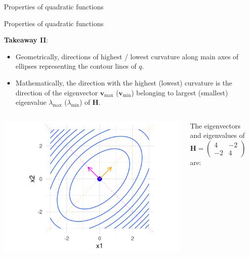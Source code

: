 \begin{frame}{Properties of quadratic functions}
{  }
  
  \end{frame}
  
  
  \begin{frame}{Properties of quadratic functions}
  
  \textbf{Takeaway II}:
  
  \begin{itemize}
    \item Geometrically, directions of highest / lowest curvature along main axes of ellipses representing the contour lines of $q$. 
    \item Mathematically, the direction with the highest (lowest) curvature is the direction of the eigenvector $\bm{v}_\text{max}$ ($\bm{v}_\text{min}$) belonging to largest (smallest) eigenvalue $\lambda_\text{max}$ ($\lambda_\text{min}$) of $\bm{H}$. 
  \end{itemize}
  
  \begin{columns}
  
  \begin{column}{0.5\textwidth}  
      \begin{center}
        \includegraphics{figure_man/quadratic_functions_2D_example_1_7.png}      
       \end{center}
  \end{column}
  
  \begin{column}{0.5\textwidth}
  
  \begin{footnotesize}
   The eigenvectors and eigenvalues of $\bm{H} = \begin{pmatrix} 4 & -2 \\ -2 & 4\end{pmatrix}$ are: 
  

\end{footnotesize}
\end{column}
\end{columns}
\end{frame}

